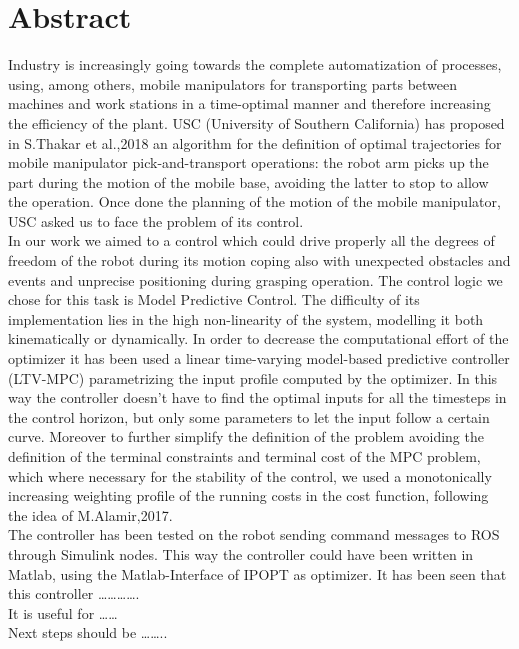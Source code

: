 	\newpage
\chapter*{Abstract}


Industry is increasingly going towards the complete automatization of processes, using, among others, mobile manipulators for transporting parts between machines and work stations in a time-optimal manner and therefore increasing the efficiency of the plant. 
USC (University of Southern California) has proposed in S.Thakar et al.,2018 an algorithm for the definition of optimal trajectories for mobile manipulator pick-and-transport operations: the robot arm picks up the part during the motion of the mobile base, avoiding the latter to stop to allow the operation.
Once done the planning of the motion of the mobile manipulator, USC asked us to face the problem of its control.\\
In our work we aimed to a control which could drive properly all the degrees of freedom of the robot during its motion coping also with unexpected obstacles and events and unprecise positioning during grasping operation.
The control logic we chose for this task is Model Predictive Control. The difficulty of its implementation lies in the high non-linearity of the system, modelling it both kinematically or dynamically.
In order to decrease the computational effort of the optimizer it has been used a linear time-varying model-based predictive controller (LTV-MPC) parametrizing the input profile computed by the optimizer. In this way the controller doesn’t have to find the optimal inputs for all the timesteps in the control horizon, but only some parameters to let the input follow a certain curve. 
Moreover to further simplify the definition of the problem avoiding the definition of the terminal constraints and terminal cost of the MPC problem, which where necessary for the stability of the control, we used a monotonically increasing weighting profile of the running costs in the cost function, following the idea of M.Alamir,2017.\\
The controller has been tested on the robot sending command messages to ROS through Simulink nodes. This way the controller could have been written in Matlab, using the Matlab-Interface of IPOPT as optimizer.
It has been seen that this controller ………….\\
It is useful for ……\\
Next steps should be ……..\\


\vspace{0.5cm}
\noindent 
